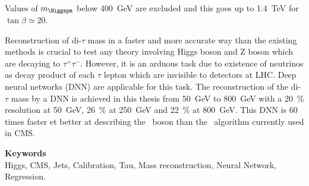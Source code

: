 Values of $m_{\Higgspm}$ below \SI{400}{\GeV} are excluded
and this goes up to 
\SI{1.4}{\TeV} for $\tan\beta\simeq\num{20}$.
\par
Reconstruction of di-$\tau$ mass in a faster and more accurate way than the existing methods is crucial to test any theory involving Higgs boson and Z boson which are decaying to $\tau^+ \tau^-$. 
However, it is an arduous task due to existence of neutrinos as decay product of each $\tau$ lepton which are invisible to detectors at LHC. 
Deep neural networks (DNN) are applicable for this task. 
The reconstruction of the di-$\tau$ mass by a DNN
is achieved in this thesis
from 
\SI{50}{\GeV} to \SI{800}{\GeV}
with a
\SI{20}{\%} resolution at \SI{50}{\GeV},
\SI{26}{\%} at \SI{250}{\GeV} and
\SI{22}{\%} at \SI{800}{\GeV}.
This DNN is
60 times faster
et better at describing the \Zboson~boson
than the \SVFIT\ algorithm currently used in CMS.

\vfill

\textbf{\Large Keywords}\\
Higgs,
CMS,
Jets,
Calibration,
Tau,
Mass reconstruction,
Neural Network,
Regression.

\vfill
